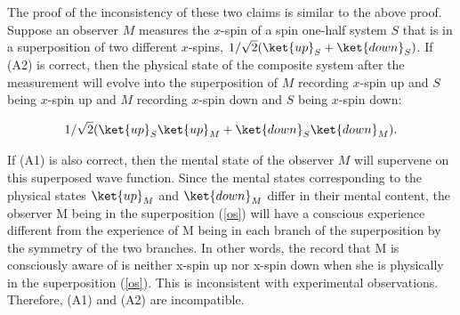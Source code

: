 

The proof of the inconsistency of these two claims is similar to the above proof. 
Suppose an observer $M$ measures the $x$-spin of a spin one-half system $S$ that is in a superposition of two different $x$-spins, $1/\sqrt{2}(\ket{up}_S+\ket{down}_S)$. If (A2) is correct, then the physical state of the composite system after the measurement will evolve into the superposition of $M$ recording $x$-spin up and $S$ being $x$-spin up and $M$ recording $x$-spin down and $S$ being $x$-spin down:

\begin{equation}
1/\sqrt{2}(\ket{up}_S \ket{up}_M+\ket{down}_S \ket{down}_M).
\label{os}
\end{equation}

\noindent If (A1) is also correct, then the mental state of the observer $M$ will supervene on this superposed wave function. Since the mental states corresponding to the physical states  $\ket{up}_M$ and $\ket{down}_M$ differ in their mental content, the observer M being in the superposition (\ref{os}) will have a conscious experience different from the experience of M being in each branch of the superposition by the symmetry of the two branches. In other words, the record that M is consciously aware of is neither x-spin up nor x-spin down when she is physically in the superposition (\ref{os}). This is inconsistent with experimental observations. Therefore, (A1) and (A2) are incompatible.


